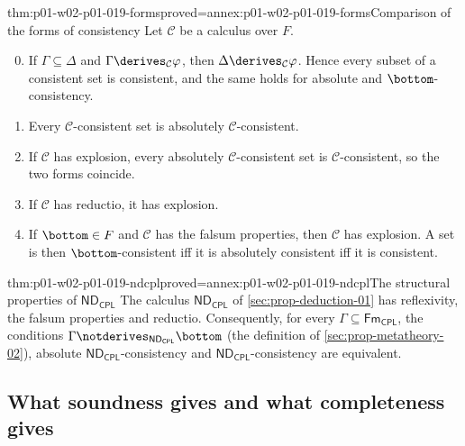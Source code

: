 \begin{hblemma}{thm:p01-w02-p01-019-forms}{proved=annex:p01-w02-p01-019-forms}{Comparison of the forms of consistency}
Let \(\mathcal C\) be a calculus over \(F\).
\begin{enumerate}
  \setcounter{enumi}{-1}
  \item If \(\Gamma\subseteq\Delta\) and
        \(\Gamma\derives_{\mathcal C}\varphi\), then
        \(\Delta\derives_{\mathcal C}\varphi\). Hence every subset of a
        consistent set is consistent, and the same holds for absolute and
        \(\bottom\)-consistency.
  \item Every \(\mathcal C\)-consistent set is absolutely
        \(\mathcal C\)-consistent.
  \item If \(\mathcal C\) has explosion, every absolutely
        \(\mathcal C\)-consistent set is \(\mathcal C\)-consistent, so the
        two forms coincide.
  \item If \(\mathcal C\) has reductio, it has explosion.
  \item If \(\bottom\in F\) and \(\mathcal C\) has the falsum properties, then
        \(\mathcal C\) has explosion. A set is then \(\bottom\)-consistent iff
        it is absolutely consistent iff it is consistent.
\end{enumerate}
\end{hblemma}

\begin{hblemma}{thm:p01-w02-p01-019-ndcpl}{proved=annex:p01-w02-p01-019-ndcpl}{The structural properties of \(\mathsf{ND}_{\mathsf{CPL}}\)}
The calculus \(\mathsf{ND}_{\mathsf{CPL}}\) of \cref{sec:prop-deduction-01}
has reflexivity, the falsum properties and reductio. Consequently, for every
\(\Gamma\subseteq\mathsf{Fm}_{\mathsf{CPL}}\), the conditions
\(\Gamma\notderives_{\mathsf{ND}_{\mathsf{CPL}}}\bottom\) (the definition of
\cref{sec:prop-metatheory-02}), absolute
\(\mathsf{ND}_{\mathsf{CPL}}\)-consistency and
\(\mathsf{ND}_{\mathsf{CPL}}\)-consistency are equivalent.
\end{hblemma}

\subsection{What soundness gives and what completeness gives}
\label{sec:p01-w02-p01-019-implications}

